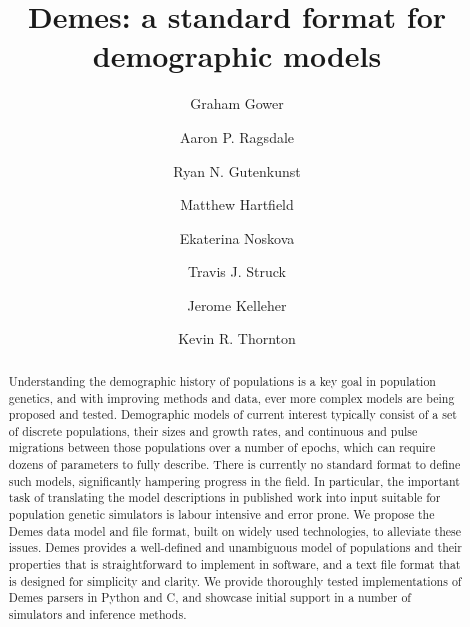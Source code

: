 \documentclass[11pt]{article}
\begin{document}
\title{Demes: a standard format for demographic models}
\author[1,$\star$]{Graham Gower}
\author[2,$\star$]{Aaron P. Ragsdale}

\author[3]{Ryan N. Gutenkunst}
\author[4]{Matthew Hartfield}
\author[5]{Ekaterina Noskova}
\author[3]{Travis J. Struck}
\author[6,$\dagger$,$\aleph$]{Jerome Kelleher}
\author[7,$\dagger$]{Kevin R. Thornton}




\maketitle

\begin{abstract}
Understanding the demographic history of populations is a
key goal in population genetics, and with improving methods
and data, ever more complex models are being proposed and tested.
Demographic models of current interest
typically consist of a set of discrete populations,
their sizes and growth rates, and continuous and pulse migrations
between those populations over a number of epochs, which can require
dozens of parameters to fully describe. There is currently
no standard format to define such models, significantly
hampering  progress in the field. In particular, the important
task of translating the model descriptions in published
work into input suitable for population genetic simulators is labour intensive
and error prone.
We propose the Demes data model and file format,
built on widely used technologies,
to alleviate these issues. Demes provides a well-defined and unambiguous
model of populations and their properties that is straightforward to
implement in software, and a text file format that is designed for
simplicity and clarity.
We provide thoroughly tested implementations of Demes parsers in Python
and C, and showcase initial support in a number of simulators and inference
methods.
\end{abstract}
\end{document}

